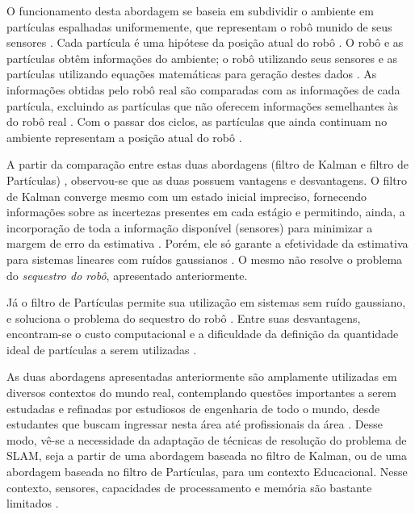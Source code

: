O funcionamento desta abordagem se baseia em subdividir o ambiente em partículas espalhadas uniformemente, que representam o robô munido de seus sensores \cite{comparacaoKalmanParticulas}. Cada partícula é uma hipótese da posição atual do robô \cite{dp-slam}. O robô e as partículas obtêm informações do ambiente; o robô utilizando seus sensores e as partículas utilizando equações matemáticas para geração destes dados \cite{comparacaoKalmanParticulas}. As informações obtidas pelo robô real são comparadas com as informações de cada partícula, excluindo as partículas que não oferecem informações semelhantes às do robô real \cite{comparacaoKalmanParticulas}. Com o passar dos ciclos, as partículas que ainda continuam no ambiente representam a posição atual do robô \cite{comparacaoKalmanParticulas}.

A partir da comparação entre estas duas abordagens (filtro de Kalman e filtro de Partículas) \cite{comparacaoKalmanParticulas}, observou-se que as duas possuem vantagens e desvantagens. O filtro de Kalman converge mesmo com um estado inicial impreciso, fornecendo informações sobre as incertezas presentes em cada estágio e permitindo, ainda, a incorporação de toda a informação disponível (sensores) para minimizar a margem de erro da estimativa \cite{comparacaoKalmanParticulas}. Porém, ele só garante a efetividade da estimativa para sistemas lineares com ruídos gaussianos \cite{comparacaoKalmanParticulas}. O mesmo não resolve o problema do \textit{sequestro do robô}, apresentado anteriormente.

Já o filtro de Partículas permite sua utilização em sistemas sem ruído gaussiano, e soluciona o problema do sequestro do robô \cite{filtroParticulasComLEGO}. Entre suas desvantagens, encontram-se o custo computacional e a dificuldade da definição da quantidade ideal de partículas a serem utilizadas \cite{comparacaoKalmanParticulas}.


As duas abordagens apresentadas anteriormente são amplamente utilizadas em diversos contextos do mundo real, contemplando questões importantes a serem estudadas e refinadas por estudiosos de engenharia de todo o mundo, desde estudantes que buscam ingressar nesta área até profissionais da área \cite{simpleRobotsIntroductionEng}. Desse modo, vê-se a necessidade da adaptação de técnicas de resolução do problema de SLAM, seja a partir de uma abordagem baseada no filtro de Kalman, ou de uma abordagem baseada no filtro de Partículas, para um contexto Educacional. Nesse contexto, sensores, capacidades de processamento e memória são bastante limitados \cite{roboticEducationBasedLego}.

